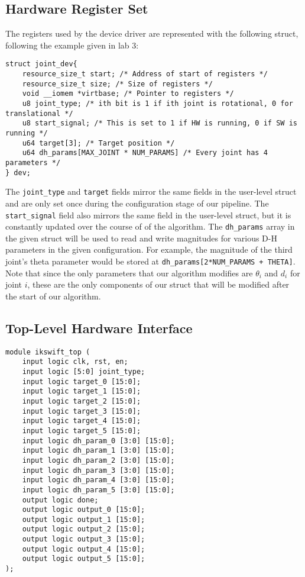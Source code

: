 \subsection{Hardware Register Set}

The registers used by the device driver are represented with the following struct, following the example given in lab 3:

\begin{verbatim}
struct joint_dev{
	resource_size_t start; /* Address of start of registers */
	resource_size_t size; /* Size of registers */
	void __iomem *virtbase; /* Pointer to registers */
	u8 joint_type; /* ith bit is 1 if ith joint is rotational, 0 for translational */
	u8 start_signal; /* This is set to 1 if HW is running, 0 if SW is running */
	u64 target[3]; /* Target position */
	u64 dh_params[MAX_JOINT * NUM_PARAMS] /* Every joint has 4 parameters */
} dev;
\end{verbatim}

The \texttt{joint\_type} and \texttt{target} fields mirror the same fields in the 
user-level struct and are only set once during the configuration
stage of our pipeline. The \texttt{start\_signal} field also mirrors the same field in the user-level
struct, but it is constantly updated over the course of of the algorithm.
The \texttt{dh\_params} array in the given struct will be used to read and 
write magnitudes for various D-H parameters in the 
given configuration. For example, the magnitude of the third joint's 
theta parameter would be stored at \texttt{dh\_params[2*NUM\_PARAMS + THETA]}. Note that
since the only parameters that our algorithm modifies are $\theta_i$ and 
$d_i$ for joint $i$, these are the only components of our struct that
will be modified after the start of our algorithm.

\subsection{Top-Level Hardware Interface}

\begin{verbatim}
module ikswift_top (
	input logic clk, rst, en;
	input logic [5:0] joint_type;
	input logic target_0 [15:0];
	input logic target_1 [15:0];
	input logic target_2 [15:0];
	input logic target_3 [15:0];
	input logic target_4 [15:0];
	input logic target_5 [15:0];
	input logic dh_param_0 [3:0] [15:0];
	input logic dh_param_1 [3:0] [15:0];
	input logic dh_param_2 [3:0] [15:0];
	input logic dh_param_3 [3:0] [15:0];
	input logic dh_param_4 [3:0] [15:0];
	input logic dh_param_5 [3:0] [15:0];
	output logic done;
	output logic output_0 [15:0];
	output logic output_1 [15:0];
	output logic output_2 [15:0];
	output logic output_3 [15:0];
	output logic output_4 [15:0];
	output logic output_5 [15:0];
);
\end{verbatim}
